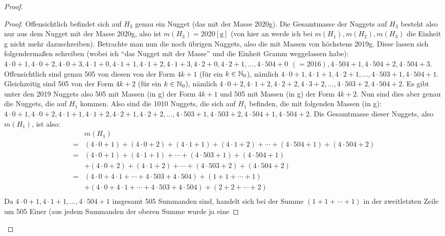 \begin{proof}
\begin{proof}
        Offensichtlich befindet sich auf $H_3$ genau ein Nugget (das mit der Masse 2020g). Die Gesamtmasse der 
        Nuggets auf $H_3$ besteht also nur aus dem Nugget mit der Masse 2020g, also ist $m(H_3) = 2020 [\text{g}]$ 
        (von hier an werde ich bei $m(H_1), m(H_2), m(H_3)$ die Einheit g nicht mehr dazuschreiben). Betrachte man 
        nun die noch übrigen Nuggets, also die mit Massen von höchstens 2019g. Diese lassen sich folgendermaßen 
        schreiben (wobei ich "`das Nugget mit der Masse"' und die Einheit Gramm weggelassen habe): 
        $4\cdot 0+1, 4\cdot 0+2, 4\cdot 0+3, 4\cdot 1+0, 4\cdot 1+1, 4\cdot 1+2, 4\cdot 1+3, 4\cdot 2+0, 4\cdot 2+1, 
        \ldots, 4\cdot 504+0\hspace{5pt} (=2016), 4\cdot 504+1, 4\cdot 504+2, 4\cdot 504+3$. Offensichtlich sind 
        genau 505 von diesen von der Form $4k +1$ (für ein $k \in \mathbb{N}_0$), nämlich $4\cdot 0+1, 4\cdot 1+1, 4\cdot 2+1, 
        \ldots, 4\cdot 503+1, 4\cdot 504+1$. Gleichzeitig sind 505 von der Form $4k+2$ (für ein $k\in\mathbb{N}_0$), nämlich 
        $4\cdot 0+2, 4\cdot 1+2, 4\cdot 2+2, 4\cdot 3+2, \ldots, 4\cdot 503+2, 4\cdot 504+2$. Es gibt unter den 2019 
        Nuggets also 505 mit Massen (in g) der Form $4k+1$ und 505 mit Massen (in g) der Form $4k+2$. Nun sind dies 
        aber genau die Nuggets, die auf $H_1$ kommen.
        Also sind die 1010 Nuggets, die sich auf $H_1$ befinden, die mit folgenden Massen (in g): $4\cdot 0+1, 
        4\cdot 0+2, 4\cdot 1+1, 4\cdot 1+2, 4\cdot 2+1, 4\cdot 2+2, \ldots, 4\cdot 503+1, 4\cdot 503+2, 4\cdot 504+1, 
        4\cdot 504+2$. Die Gesamtmasse dieser Nuggets, also $m(H_1)$, ist also:
        \begin{align*}
            &m(H_1)\\
            =&(4\cdot 0+1)+(4\cdot 0+2)+(4\cdot 1+1)+(4\cdot 1+2)+\cdots+(4\cdot 504+1)+(4\cdot 504+2)\\
            = &(4\cdot 0+1)+(4\cdot1+1)+\cdots+(4\cdot 503+1)+(4\cdot 504+1)\\
            &+(4\cdot 0+2)+(4\cdot1+2)+\cdots+(4\cdot 503+2)+(4\cdot 504+2)\\
            = &(4\cdot0+4\cdot1+\cdots+4\cdot503+4\cdot504)+(1+1+\cdots+1)\\
            &+(4\cdot0+4\cdot1+\cdots+4\cdot503+4\cdot504)+(2+2+\cdots+2)\\
        \end{align*}
        Da $4\cdot0+1, 4\cdot1+1, \ldots, 4\cdot504+1$ insgesamt 505 Summanden sind, handelt sich bei der Summe
        $(1+1+\cdots+1)$ in der zweitletzten Zeile um 505 Einer (aus jedem Summanden der oberen Summe wurde ja eine 

\end{proof}
\end{proof}
